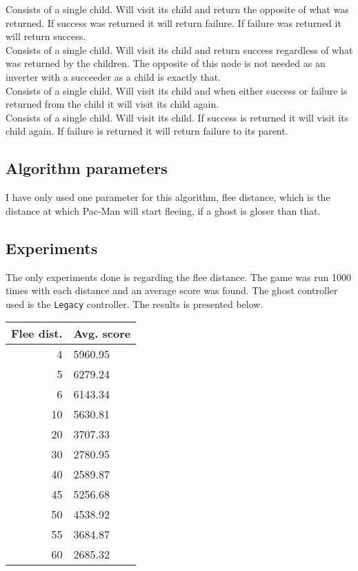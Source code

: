 Consists of a single child. Will visit its child and return the opposite of what was returned. If success was returned it will return failure. If failure was returned it will return success. \\

Consists of a single child. Will visit its child and return success regardless of what was returned by the children. The opposite of this node is not needed as an inverter with a succeeder as a child is exactly that. \\

Consists of a single child. Will visit its child and when either success or failure is returned from the child it will visit its child again. \\

Consists of a single child. Will visit its child. If success is returned it will visit its child again. If failure is returned it will return failure to its parent.

\subsection{Algorithm parameters}
I have only used one parameter for this algorithm, flee distance, which is the distance at which Pac-Man will start fleeing, if a ghost is gloser than that.

\subsection{Experiments}
The only experiments done is regarding the flee distance. The game was run 1000 times with each distance and an average score was found. The ghost controller used is the \texttt{Legacy} controller. The results is presented below. \\

\begin{tabular}{ | r | l | }
	\hline
	Flee dist. & Avg. score \\ \hline
	4 & 5960.95 \\ \hline
	5 & 6279.24 \\ \hline
	6 & 6143.34 \\ \hline
	10 & 5630.81 \\ \hline
	20 & 3707.33 \\ \hline
	30 & 2780.95 \\ \hline
	40 & 2589.87 \\ \hline
	45 & 5256.68 \\ \hline
	50 & 4538.92 \\ \hline
	55 & 3684.87 \\ \hline
	60 & 2685.32 \\
	\hline
\end{tabular} \\

